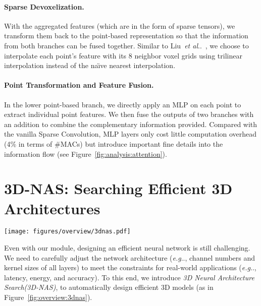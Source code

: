 \documentclass[runningheads]{llncs}
\makeatletter
\newcommand{\fig}[1]{Figure~\ref{#1}}
\def\naive{na\"{\i}ve\xspace}
\DeclareRobustCommand\onedot{\futurelet\@let@token\@onedot}
\def\@onedot{\ifx\@let@token.\else.\null\fi\xspace}
\def\eg{\emph{e.g}\onedot} \def\Eg{\emph{E.g}\onedot}
\def\etal{\emph{et al}\onedot}
\def\moduleshort{SPVConv\xspace}
\def\nas{3D Neural Architecture Search\xspace}
\def\nasshort{3D-NAS\xspace}
\makeatother
\begin{document}
\paragraph{Sparse Devoxelization.}

With the aggregated features (which are in the form of sparse tensors), we transform them back to the point-based representation so that the information from both branches can be fused together. Similar to Liu~\etal~\cite{liu2019point}, we choose to interpolate each point's feature with its 8 neighbor voxel grids using trilinear interpolation instead of the \naive nearest interpolation.

\paragraph{Point Transformation and Feature Fusion.}

In the lower point-based branch, we directly apply an MLP on each point to extract individual point features. We then fuse the outputs of two branches with an addition to combine the complementary information provided. Compared with the vanilla Sparse Convolution, MLP layers only cost little computation overhead (4\% in terms of \#MACs) but introduce important fine details into the information flow (see \fig{fig:analysis:attention}).

\section{\nasshort: Searching Efficient 3D Architectures}

\begin{figure*}[t]
\centering
\texttt{[image: figures/overview/3dnas.pdf]}
\caption{Overview of \nas (\nasshort): we first train a super network composed of multiple \moduleshort's, supporting fine-grained channel numbers and elastic network depths. Then, we perform the evolutionary architecture search to obtain the best candidate model under a given computation constraint.}
\label{fig:overview:3dnas}
\end{figure*} 
Even with our module, designing an efficient neural network is still challenging. We need to carefully adjust the network architecture (\eg, channel numbers and kernel sizes of all layers) to meet the constraints for real-world applications (\eg, latency, energy, and accuracy). To this end, we introduce \emph{\nas (\nasshort)}, to automatically design efficient 3D models (as in \fig{fig:overview:3dnas}).
\end{document}
